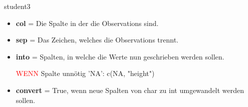 \begin{rcode}{1}
student3 %
\end{rcode}
\begin{itemize}[noitemsep]
  \item \textbf{col} = Die Spalte in der die Observations sind. 
  \item \textbf{sep} = Das Zeichen, welches die Observations trennt.
  \item \textbf{into} = Spalten, in welche die Werte nun geschrieben werden sollen. 
  
  \textcolor{red}{WENN} Spalte unnötig 'NA': c(NA, "height")
  \item \textbf{convert} = True, wenn neue Spalten von char zu int umgewandelt werden sollen.
\end{itemize}

